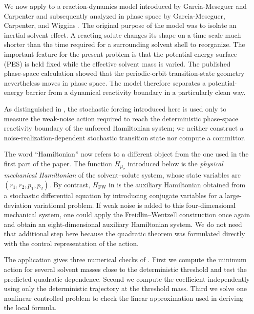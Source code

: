\documentclass[11pt]{article}
\theoremstyle{definition}
\theoremstyle{remark}
\begin{document}
We now apply  to a reaction-dynamics model introduced by Garcia-Meseguer and Carpenter and subsequently analyzed in phase space by Garcia-Meseguer, Carpenter, and Wiggins \cite{GarciaMeseguerCarpenter2019,GarciaMeseguerCarpenterWiggins2019}.  The original purpose of the model was to isolate an inertial solvent effect.  A reacting solute changes its shape on a time scale much shorter than the time required for a surrounding solvent shell to reorganize.  The important feature for the present problem is that the potential-energy surface (PES) is held fixed while the effective solvent mass is varied.  The published phase-space calculation showed that the periodic-orbit transition-state geometry nevertheless moves in phase space.  The model therefore separates a potential-energy barrier from a dynamical reactivity boundary in a particularly clean way.

As distinguished in , the stochastic forcing introduced here is used only to measure the weak-noise action required to reach the deterministic phase-space reactivity boundary of the unforced Hamiltonian system; we neither construct a noise-realization-dependent stochastic transition state nor compute a committor.

The word ``Hamiltonian'' now refers to a different object from the one used in the first part of the paper.  The function $H_{\mu_2}$ introduced below is the \emph{physical mechanical Hamiltonian} of the solvent--solute system, whose state variables are $(r_1,r_2,p_1,p_2)$.  By contrast, $H_{\mathrm{FW}}$ in  is the auxiliary Hamiltonian obtained from a stochastic differential equation by introducing conjugate variables for a large-deviation variational problem.  If weak noise is added to this four-dimensional mechanical system, one could apply the Freidlin--Wentzell construction once again and obtain an eight-dimensional auxiliary Hamiltonian system.  We do not need that additional step here because the quadratic theorem was formulated directly with the control representation of the action.

The application gives three numerical checks of .  First we compute the minimum action for several solvent masses close to the deterministic threshold and test the predicted quadratic dependence.  Second we compute the coefficient independently using only the deterministic trajectory at the threshold mass.  Third we solve one nonlinear controlled problem to check the linear approximation used in deriving the local formula.
\end{document}
